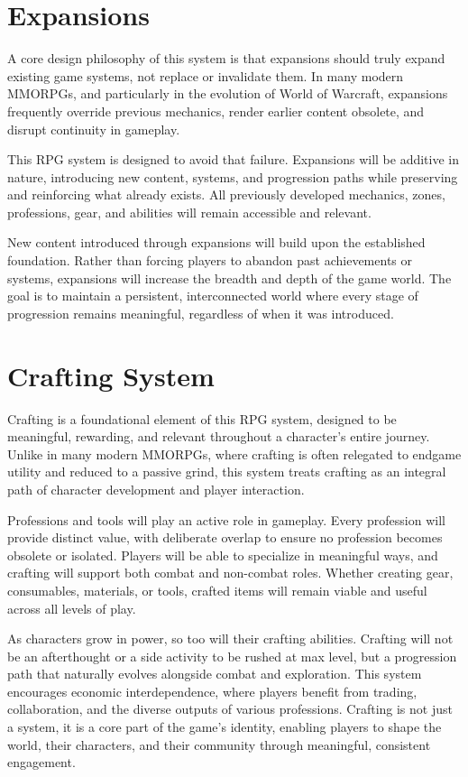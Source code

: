 \section{Expansions}

A core design philosophy of this system is that expansions should truly expand existing game systems, not replace or invalidate them. In many modern MMORPGs, and particularly in the evolution of World of Warcraft, expansions frequently override previous mechanics, render earlier content obsolete, and disrupt continuity in gameplay.

This RPG system is designed to avoid that failure. Expansions will be additive in nature, introducing new content, systems, and progression paths while preserving and reinforcing what already exists. All previously developed mechanics, zones, professions, gear, and abilities will remain accessible and relevant.

New content introduced through expansions will build upon the established foundation. Rather than forcing players to abandon past achievements or systems, expansions will increase the breadth and depth of the game world. The goal is to maintain a persistent, interconnected world where every stage of progression remains meaningful, regardless of when it was introduced.








\section{Crafting System}

Crafting is a foundational element of this RPG system, designed to be meaningful, rewarding, and relevant throughout a character's entire journey. Unlike in many modern MMORPGs, where crafting is often relegated to endgame utility and reduced to a passive grind, this system treats crafting as an integral path of character development and player interaction.

Professions and tools will play an active role in gameplay. Every profession will provide distinct value, with deliberate overlap to ensure no profession becomes obsolete or isolated. Players will be able to specialize in meaningful ways, and crafting will support both combat and non-combat roles. Whether creating gear, consumables, materials, or tools, crafted items will remain viable and useful across all levels of play.

As characters grow in power, so too will their crafting abilities. Crafting will not be an afterthought or a side activity to be rushed at max level, but a progression path that naturally evolves alongside combat and exploration. This system encourages economic interdependence, where players benefit from trading, collaboration, and the diverse outputs of various professions. Crafting is not just a system, it is a core part of the game's identity, enabling players to shape the world, their characters, and their community through meaningful, consistent engagement.










